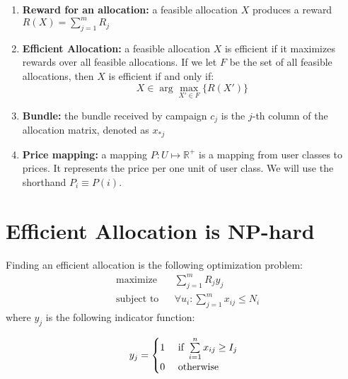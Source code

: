 \documentclass[12pt,letterpaper]{article}
\newcommand{\Campaign}{c}
\newcommand{\CampaignIndex}{j}
\newcommand{\CardinalityCampaigns}{m}
\newcommand{\User}{u}
\newcommand{\UserIndex}{i}
\newcommand{\Users}{U}
\newcommand{\CardinalityUsers}{n}
\newcommand{\Impressions}{I}
\newcommand{\Reward}{R}
\newcommand{\NumberOfUsers}{N}
\newcommand{\Price}{P}
\newcommand{\AllocationMatrix}{X}
\newcommand{\AllocationMatrixEntry}{x}
\begin{document}
\begin{enumerate}
\item \textbf{Reward for an allocation:} a feasible allocation $\AllocationMatrix$ produces a reward $\Reward(\AllocationMatrix) = \sum\limits_{j=1}^\CardinalityCampaigns \Reward_\CampaignIndex$

\item \textbf{Efficient Allocation:} a feasible allocation $X$ is efficient if it maximizes rewards over all feasible allocations. If we let $F$ be the set of all feasible allocations, then $X$ is efficient if and only if:
 $$X\in\arg\max\limits_{\AllocationMatrix'\in F}\{\Reward(\AllocationMatrix')\}$$

\item \textbf{Bundle:} the bundle received by campaign $\Campaign_\CampaignIndex$ is the $j$-th column of the allocation matrix, denoted as $\AllocationMatrixEntry_{*j}$

\item \textbf{Price mapping:} a mapping $P: \Users \mapsto \mathbb{R}^+$ is a mapping from user classes to prices. It represents the price per one unit of user class.
We will use the shorthand $\Price_\UserIndex\equiv\Price(\UserIndex)$.


\end{enumerate}

\section*{Efficient Allocation is NP-hard}

Finding an efficient allocation is the following optimization problem:
\begin{equation*}
\begin{aligned}
& \underset{}{\text{maximize}}
& & \sum\limits_{\CampaignIndex=1}^\CardinalityCampaigns \Reward_\CampaignIndex y_\CampaignIndex  \\
& \text{subject to}
& & \forall \User_\UserIndex: \sum\limits_{j=1}^\CardinalityCampaigns \AllocationMatrixEntry_{\UserIndex\CampaignIndex} \le \NumberOfUsers_\UserIndex
\end{aligned}
\end{equation*}
where $y_j$ is the following indicator function:

\[
 y_\CampaignIndex =
  \begin{cases} 
      \hfill 1 \hfill & \text{ if } \sum\limits_{\UserIndex=1}^\CardinalityUsers \AllocationMatrixEntry_{ij} \ge \Impressions_\CampaignIndex \\
      \hfill 0 \hfill & \text{ otherwise } \\
  \end{cases}
\]
\end{document}
